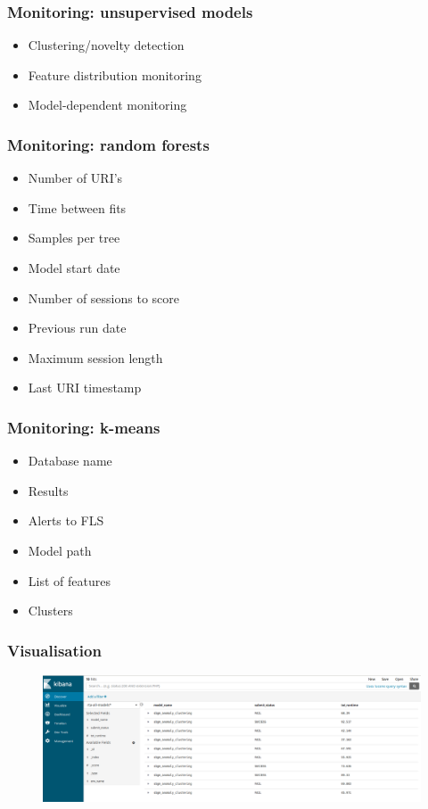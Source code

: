 \documentclass[11pt]{beamer}
\begin{document}
\begin{frame}
\frametitle{Monitoring: unsupervised models}
\begin{itemize}
	\item Clustering/novelty detection
	\item Feature distribution monitoring
	\item Model-dependent monitoring
\end{itemize}
\end{frame}


\begin{frame}
\frametitle{Monitoring: random forests}
\begin{itemize}
	\item Number of URI’s
	\item Time between fits
	\item Samples per tree
	\item Model start date
	\item Number of sessions to score
	\item Previous run date
	\item Maximum session length
	\item Last URI timestamp
\end{itemize}
\end{frame}


\begin{frame}
\frametitle{Monitoring: k-means}
\begin{itemize}
	\item Database name
	\item Results
	\item Alerts to FLS
	\item Model path
	\item List of features
	\item Clusters
\end{itemize}
\end{frame}


\begin{frame}
\frametitle{Visualisation}
\begin{figure}[h]
	\includegraphics[scale=.2]{images/viz1}
\end{figure}
\end{frame}
\end{document}
